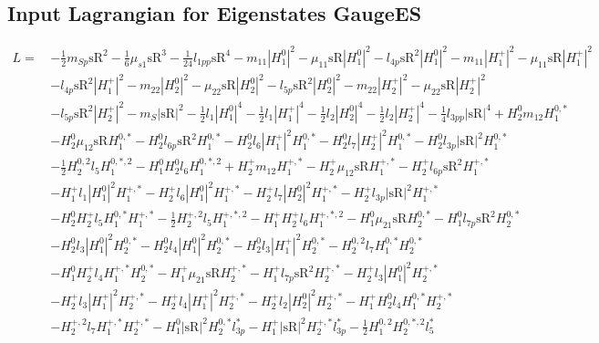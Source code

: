 \subsection{Input Lagrangian for Eigenstates GaugeES} 
\begin{align} 
L = \, & -\frac{1}{2} m_{Sp} \text{sR}^{2} -\frac{1}{6} \mu_{s1} \text{sR}^{3} -\frac{1}{24} l_{1pp} \text{sR}^{4} - m_{11} |H_1^0|^2 - \mu_{11} \text{sR} |H_1^0|^2 - l_{4p} \text{sR}^{2} |H_1^0|^2 - m_{11} |H_1^+|^2 - \mu_{11} \text{sR} |H_1^+|^2 \nonumber \\ 
 &- l_{4p} \text{sR}^{2} |H_1^+|^2 - m_{22} |H_2^0|^2 - \mu_{22} \text{sR} |H_2^0|^2 - l_{5p} \text{sR}^{2} |H_2^0|^2 - m_{22} |H_2^+|^2 - \mu_{22} \text{sR} |H_2^+|^2 \nonumber \\ 
 &- l_{5p} \text{sR}^{2} |H_2^+|^2 - m_{S} |\text{sR}|^2 -\frac{1}{2} l_1 |H_1^0|^4 -\frac{1}{2} l_1 |H_1^+|^4 -\frac{1}{2} l_2 |H_2^0|^4 -\frac{1}{2} l_2 |H_2^+|^4 -\frac{1}{4} l_{3pp} |\text{sR}|^4 +H_2^0 m_{12} H_1^{0,*} \nonumber \\ 
 &- H_2^0 \mu_{12} \text{sR} H_1^{0,*} - H_2^0 l_{6p} \text{sR}^{2} H_1^{0,*} - H_2^0 l_6 |H_1^+|^2 H_1^{0,*} - H_2^0 l_7 |H_2^+|^2 H_1^{0,*} - H_2^0 l_{3p} |\text{sR}|^2 H_1^{0,*} \nonumber \\ 
 &-\frac{1}{2} H_{2}^{0,2} l_5 H_{1}^{0,*,2} - H_1^0 H_2^0 l_6 H_{1}^{0,*,2} +H_2^+ m_{12} H_1^{+,*} - H_2^+ \mu_{12} \text{sR} H_1^{+,*} - H_2^+ l_{6p} \text{sR}^{2} H_1^{+,*} \nonumber \\ 
 &- H_1^+ l_1 |H_1^0|^2 H_1^{+,*} - H_2^+ l_6 |H_1^0|^2 H_1^{+,*} - H_2^+ l_7 |H_2^0|^2 H_1^{+,*} - H_2^+ l_{3p} |\text{sR}|^2 H_1^{+,*} \nonumber \\ 
 &- H_2^0 H_2^+ l_5 H_1^{0,*} H_1^{+,*} -\frac{1}{2} H_{2}^{+,2} l_5 H_{1}^{+,*,2} - H_1^+ H_2^+ l_6 H_{1}^{+,*,2} - H_1^0 \mu_{21} \text{sR} H_2^{0,*} - H_1^0 l_{7p} \text{sR}^{2} H_2^{0,*} \nonumber \\ 
 &- H_2^0 l_3 |H_1^0|^2 H_2^{0,*} - H_2^0 l_4 |H_1^0|^2 H_2^{0,*} - H_2^0 l_3 |H_1^+|^2 H_2^{0,*} - H_{2}^{0,2} l_7 H_1^{0,*} H_2^{0,*} \nonumber \\ 
 &- H_1^0 H_2^+ l_4 H_1^{+,*} H_2^{0,*} - H_1^+ \mu_{21} \text{sR} H_2^{+,*} - H_1^+ l_{7p} \text{sR}^{2} H_2^{+,*} - H_2^+ l_3 |H_1^0|^2 H_2^{+,*} \nonumber \\ 
 &- H_2^+ l_3 |H_1^+|^2 H_2^{+,*} - H_2^+ l_4 |H_1^+|^2 H_2^{+,*} - H_2^+ l_2 |H_2^0|^2 H_2^{+,*} - H_1^+ H_2^0 l_4 H_1^{0,*} H_2^{+,*} \nonumber \\ 
 &- H_{2}^{+,2} l_7 H_1^{+,*} H_2^{+,*} - H_1^0 |\text{sR}|^2 H_2^{0,*} l_{3p}^* - H_1^+ |\text{sR}|^2 H_2^{+,*} l_{3p}^* -\frac{1}{2} H_{1}^{0,2} H_{2}^{0,*,2} l_5^* \nonumber \\ 

\end{align}
